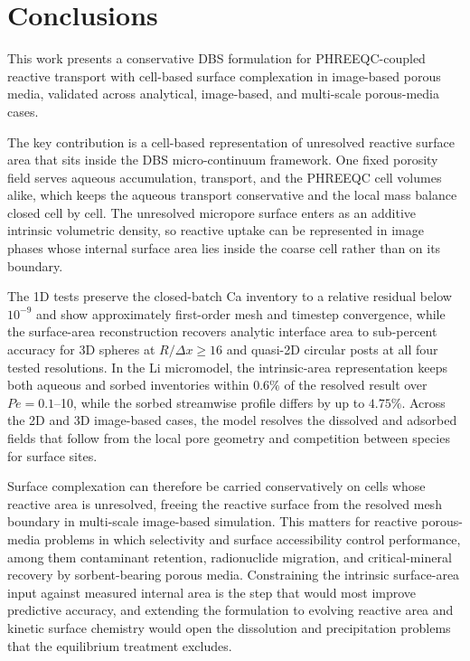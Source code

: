 \section{Conclusions}

This work presents a conservative DBS formulation for PHREEQC-coupled reactive
transport with cell-based surface complexation in image-based porous media,
validated across analytical, image-based, and multi-scale porous-media cases.

The key contribution is a cell-based representation of unresolved reactive
surface area that sits inside the DBS micro-continuum framework. One fixed
porosity field serves aqueous accumulation, transport, and the PHREEQC cell
volumes alike, which keeps the aqueous transport conservative and the local
mass balance closed cell by cell. The unresolved micropore surface enters as an
additive intrinsic volumetric density, so reactive uptake can be represented in
image phases whose internal surface area lies inside the coarse cell rather
than on its boundary.

The 1D tests preserve the closed-batch Ca inventory to a relative residual
below $10^{-9}$ and show approximately first-order mesh and timestep
convergence, while the surface-area reconstruction recovers analytic interface
area to sub-percent accuracy for 3D spheres at $R/\Delta x\ge16$ and
quasi-2D circular posts at all four tested resolutions. In the Li micromodel, the
intrinsic-area representation keeps both aqueous and sorbed inventories within
$0.6\%$ of the resolved result over $Pe=0.1$--10, while the sorbed streamwise
profile differs by up to $4.75\%$. Across the 2D and 3D image-based cases, the
model resolves the dissolved and adsorbed fields that follow from the local
pore geometry and competition between species for surface sites.

Surface complexation can therefore be carried conservatively on cells whose
reactive area is unresolved, freeing the reactive surface from the resolved
mesh boundary in multi-scale image-based simulation. This matters for reactive
porous-media problems in which selectivity and surface accessibility control
performance, among them contaminant retention, radionuclide migration, and
critical-mineral recovery by sorbent-bearing porous media. Constraining the intrinsic surface-area input against measured internal area is
the step that would most improve predictive accuracy, and extending the
formulation to evolving reactive area and kinetic surface chemistry would open
the dissolution and precipitation problems that the equilibrium treatment
excludes.
